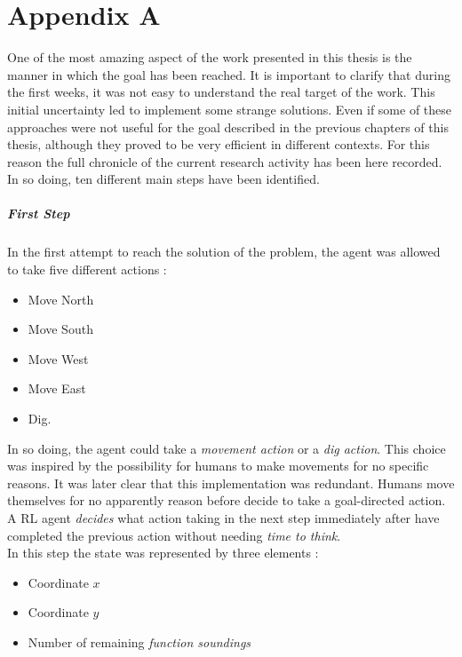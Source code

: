\chapter{Appendix A}

One of the most amazing aspect of the work presented in this thesis is the manner in which the goal has been reached. It is important to clarify that during the first weeks, it was not easy to understand the real target of the work. This initial uncertainty led to implement some strange solutions. Even if some of these approaches were not useful for the goal described in the previous chapters of this thesis, although they proved to be very efficient in different contexts. For this reason the full chronicle of the current research activity has been here recorded. In so doing, ten different main steps have been identified. 

\paragraph{First Step} In the first attempt to reach the solution of the problem, the agent was allowed to take five different actions :

\begin{itemize}
	\item Move North
	\item Move South
	\item Move West
	\item Move East
	\item Dig.
\end{itemize}

In so doing, the agent could take a \textit{movement action} or a \textit{dig action}. This choice was inspired by the possibility for humans to make movements for no specific reasons. It was later clear that this implementation was redundant. Humans move themselves for no apparently reason before decide to take a goal-directed action. A RL agent \textit{decides} what action taking in the next step immediately after have completed the previous action without needing \textit{time to think}. \\

In this step the state was represented by three elements :

\begin{itemize}
	\item Coordinate $x$
	\item Coordinate $y$
	\item Number of remaining \textit{function soundings}
\end{itemize}


